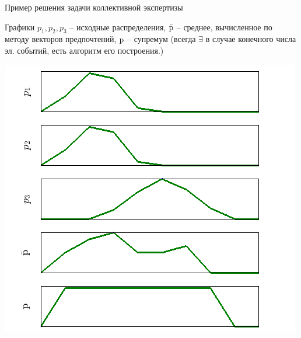 \begin{frame}{Пример решения задачи коллективной экспертизы}
  \vspace{-2.5ex}
  \begin{center}
    Графики $p_1, p_2, p_3$ -- исходные распределения, $\bar{{\mathrm{p}}}$ -- среднее, вычисленное по методу векторов предпочтений, ${\mathrm{p}}$ -- супремум (всегда $\exists$ в случае конечного числа эл. событий, есть алгоритм его построения.) 
  \end{center} 
  \vspace{-4ex}
	  \begin{center}
	      \includegraphics[width=0.55\linewidth]{./pic/prefsup102}
	  \end{center}
\end{frame} %

